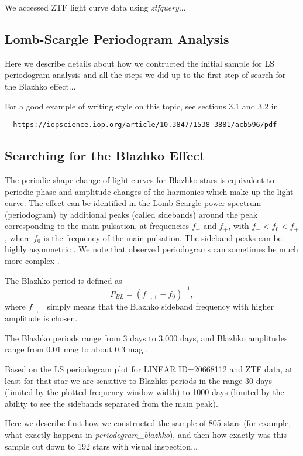 We accessed ZTF light curve data using {\it ztfquery}...




\subsection{Lomb-Scargle Periodogram Analysis}

Here we describe details about how we contructed the initial sample for LS periodogram analysis and all the
steps we did up to the first step of search for the Blazhko effect... 

For a good example of writing style on this topic, see sections 3.1 and 3.2 in
\begin{verbatim}
  https://iopscience.iop.org/article/10.3847/1538-3881/acb596/pdf
\end{verbatim}

\subsection{Searching for the Blazhko Effect}

The periodic shape change of light curves for Blazhko stars is equivalent to periodic phase and amplitude changes of the
harmonics which make up the light curve. The effect can be identified in the Lomb-Scargle power spectrum (periodogram)
by additional peaks (called sidebands) around the peak corresponding to the main pulsation, at frequencies $f_-$ and $f_+$,
with $f_- < f_0 < f_+$, where $f_0$ is the frequency of the main pulsation. The sideband peaks can be highly asymmetric
\cite{2003ApJ...598..597A}. We note that observed periodograms can sometimes be much more complex \cite{2007MNRAS.377.1263S}. 

The Blazhko period is defined as
\begin{equation}
  P_{BL} = (f_{-,+} - f_0)^{-1},
\end{equation}
where $f_{-,+}$ simply means that the Blazhko sideband frequency with higher amplitude is chosen. 

The Blazhko periods range from 3 days to 3,000 days, and Blazhko amplitudes range from 0.01 mag to about 0.3 mag \cite{2007MNRAS.377.1263S}.

%

Based on the LS periodogram plot for LINEAR ID=20668112 and ZTF data, at least for that star we are
sensitive to Blazhko periods in the range 30 days (limited by the plotted frequency window width) to
1000 days (limited by the ability to see the sidebands separated from the main peak). 


Here we describe first how we constructed the sample of 805 stars (for example, what exactly happens in
{\it periodogram\_blazhko}), and then how exactly was this sample cut down to 192 stars with visual inspection... 